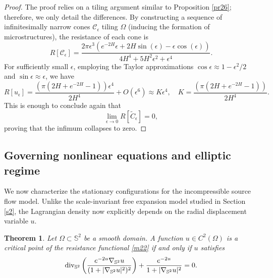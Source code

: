 \documentclass[a4paper,12pt]{amsart}
\theoremstyle{plain}
\newtheorem{theorem}{Theorem}[section]
\theoremstyle{definition}
\begin{document}
\begin{proof}
The proof relies on a tiling argument similar to Proposition \ref{pr26}; therefore,  we only detail the differences. 
By constructing a sequence of infinitesimally narrow cones $\mathcal{C}_\epsilon$ tiling   $\Omega$ (inducing the formation of microstructures), the resistance of each cone is 
$$R[\mathcal{C}_\epsilon]=\frac{2 \pi \epsilon ^3 \left(e^{-2 H} \epsilon +2 H \sin (\epsilon )-\epsilon \cos (\epsilon )\right)}{4 H^4+5 H^2 \epsilon ^2+\epsilon ^4}.$$
For sufficiently small $\epsilon$, employing the Taylor approximations $\cos\epsilon \approx 1-\epsilon^2/2$ and $\sin\epsilon\approx \epsilon$, we have 
\begin{equation*}
 R[u_\epsilon]=\frac{\left(\pi \left(2 H+e^{-2 H}-1\right)\right) \epsilon ^4}{2 H^4}+O\left(\epsilon ^6\right) \approx K \epsilon^4 ,\quad K=\frac{\left(\pi \left(2 H+e^{-2 H}-1\right)\right) }{2 H^4}.
\end{equation*}
This is enough to conclude again that 
\begin{equation*}
 \lim_{\epsilon \to 0} R[\widetilde{C}_\epsilon] = 0,
\end{equation*}
proving that the infimum collapses to zero.
 \end{proof}

 

\subsection{Governing nonlinear equations and elliptic regime}

We now characterize the stationary configurations for the incompressible source flow model. Unlike the scale-invariant free expansion model studied in Section \ref{s2}, the Lagrangian density now explicitly depends on the radial displacement variable $u$. 

\begin{theorem}
Let $\Omega \subset \mathbb{S}^2$ be a smooth domain. A function $u \in C^2(\Omega)$ is a critical point of the 
resistance functional \eqref{m22} if and only if $u$ satisfies 
\begin{equation} \label{28}
 {\rm div}_{\mathbb{S}^2} \left( \frac{e^{-2u} \nabla_{\mathbb{S}^2} u}{(1 + |\nabla_{\mathbb{S}^2} u|^2)^2} \right) + \frac{e^{-2u}}{1 + |\nabla_{\mathbb{S}^2} u|^2} = 0.
\end{equation}
\end{theorem}
\end{document}

